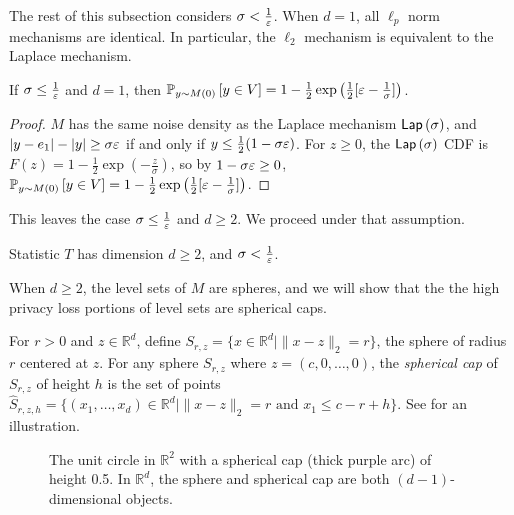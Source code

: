 The rest of this subsection considers $\sigma < \frac{1}{\varepsilon}$. When $d=1$, all $\ell_p$ norm mechanisms are identical. In particular, the $\ell_2$ mechanism is equivalent to the Laplace mechanism.

\begin{lemma}
\label{lem:one_dim}
    If $\sigma \leq \frac{1}{\varepsilon}$ and $d = 1$, then $\mathbb{P}_{y \sim M(0)}\left[y \in V\right] = 1 - \frac{1}{2}\exp\left(\frac{1}{2}[\varepsilon - \frac{1}{\sigma}]\right)$.
\end{lemma}
\begin{proof}
    $M$ has the same noise density as the Laplace mechanism $\mathsf{Lap}\left(\sigma\right)$, and $|y-e_1| - |y| \geq \sigma \varepsilon$ if and only if $y \leq \frac{1}{2}(1 - \sigma \varepsilon)$. For $z \geq 0$, the $\mathsf{Lap}\left(\sigma\right)$ CDF is $F(z) = 1 - \frac{1}{2}\exp\left(-\frac{z}{\sigma}\right)$, so by $1 - \sigma \varepsilon \geq 0$, $\mathbb{P}_{y \sim M(0)}\left[y \in V\right] = 1 - \frac{1}{2}\exp\left(\frac{1}{2}[\varepsilon - \frac{1}{\sigma}]\right)$.
\end{proof}

This leaves the case $\sigma \leq \frac{1}{\varepsilon}$ and $d \geq 2$. We proceed under that assumption.

\begin{assumption}
\label{assm:d_sigma}
    Statistic $T$ has dimension $d \geq 2$, and $\sigma < \frac{1}{\varepsilon}$.
\end{assumption}

When $d \geq 2$, the level sets of $M$ are spheres, and we will show that the the high privacy loss portions of level sets are spherical caps.

\begin{definition}
\label{def:spheres}
    For $r > 0$ and $z \in \mathbb{R}^d$, define $S_{r,z} = \{x \in \mathbb{R}^d \mid \|x-z\|_2 = r\}$, the sphere of radius $r$ centered at $z$. For any sphere $S_{r,z}$ where $z = (c, 0, \ldots, 0)$, the \emph{spherical cap} of $S_{r,z}$ of height $h$ is the set of points $\hat S_{r,z,h} = \{(x_1, \ldots, x_d) \in \mathbb{R}^d \mid \|x-z\|_2=r \text{ and } x_1 \leq c-r+h\}$. See  for an illustration.
\end{definition}

\begin{figure}[h]
    \centering
    \caption{The unit circle in $\mathbb{R}^2$ with a spherical cap (thick purple arc) of height 0.5. In $\mathbb{R}^d$, the sphere and spherical cap are both $(d-1)$-dimensional objects.}
    \label{fig:cap}
\end{figure}

